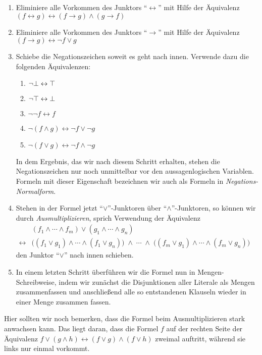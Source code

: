 \begin{enumerate}
\item Eliminiere alle Vorkommen des Junktors ``$\leftrightarrow$'' mit Hilfe der \"{A}quivalenz \\[0.2cm]
      \hspace*{1.3cm} 
      $(f \leftrightarrow g) \leftrightarrow (f \rightarrow g) \wedge (g \rightarrow f)$
\item Eliminiere alle Vorkommen des Junktors ``$\rightarrow$'' mit Hilfe der \"{A}quivalenz \\[0.2cm]
      \hspace*{1.3cm} 
      $(f \rightarrow g) \leftrightarrow \neg f \vee g$
\item Schiebe die Negationszeichen soweit es geht nach innen.  Verwende dazu die folgenden \"{A}quivalenzen:
      \begin{enumerate}
      \item $\neg \bot \leftrightarrow \top$
      \item $\neg \top \leftrightarrow \bot$
      \item $\neg \neg f \leftrightarrow f$
      \item $\neg (f \wedge g) \leftrightarrow  \neg f \vee   \neg g$ 
      \item $\neg (f \vee   g) \leftrightarrow  \neg f \wedge \neg g$ 
      \end{enumerate}
      In dem Ergebnis, das wir nach diesem Schritt erhalten, stehen die Negationszeichen
      nur noch unmittelbar vor den aussagenlogischen Variablen.  Formeln mit dieser
      Eigenschaft bezeichnen wir auch als Formeln in \emph{\color{blue}Negations-Normalform}.
\item Stehen in der Formel jetzt ``$\vee$''-Junktoren \"{u}ber ``$\wedge$''-Junktoren, so k\"{o}nnen wir durch
      \emph{\color{blue}Ausmultiplizieren}, sprich Verwendung der \"Aquivalenz \\[0.2cm]
      \hspace*{1.3cm} 
      $
      \begin{array}{cl}
                      & (f_1 \wedge \cdots \wedge f_m) \vee (g_1 \wedge \cdots \wedge g_n) \\[0.2cm]
      \leftrightarrow & \bigl((f_1 \vee g_1) \wedge \cdots \wedge (f_1 \vee g_n)\bigr) \;\wedge \;\cdots\; \wedge\;
                        \bigl((f_m \vee g_1) \wedge \cdots \wedge (f_m \vee g_n)\bigr)
      \end{array}
      $
      \\[0.2cm]
      den Junktor ``$\vee$'' nach innen schieben.
\item In einem letzten Schritt \"{u}berf\"{u}hren wir die Formel nun in Mengen-Schreibweise, indem
      wir zun\"{a}chst die Disjunktionen aller Literale als Mengen zusammenfassen und anschlie\ss{}end
      alle so entstandenen Klauseln wieder in einer Menge zusammen fassen.
\end{enumerate}
Hier sollten wir noch bemerken, dass die Formel beim Ausmultiplizieren stark anwachsen kann.
Das liegt daran, dass die Formel $f$ auf der rechten Seite der \"{A}quivalenz 
$f \vee (g \wedge h) \leftrightarrow (f \vee g) \wedge (f \vee h)$ zweimal auftritt, w\"{a}hrend sie
links nur einmal vorkommt. 

